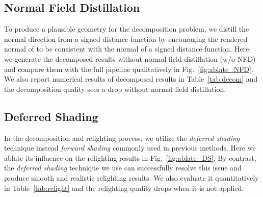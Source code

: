 \subsection{Normal Field Distillation}
To produce a plausible geometry for the decomposition problem, we distill the normal direction from a signed distance function by encouraging the rendered normal of  to be consistent with the normal of a signed distance function. 
Here, we generate the decomposed results without normal field distillation (w/o NFD) and compare them with the full pipeline qualitatively in Fig.~\ref{fig:ablate_NFD}. 
We also report numerical results of decomposed results in Table~\ref{tab:decom} and the decomposition quality sees a drop without normal field distillation. 


\subsection{Deferred Shading}
In the decomposition and relighting process, we utilize the \textit{deferred shading} technique instead  \textit{forward shading} commonly used in previous methods. 
Here we ablate its influence on the relighting results in Fig.~\ref{fig:ablate_DS}. 
By contrast, the \textit{deferred shading} technique we use can successfully resolve this issue and produce smooth and realistic relighting results. 
We also evaluate it quantitatively in Table~\ref{tab:relight} and the relighting quality drops when it is not applied. 







